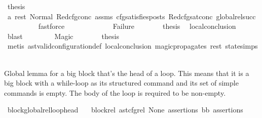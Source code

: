 \begin{isabellebody}
\ {\isacharquery}{\kern0pt}thesis\ \isamarkupfalse%
\ a{}\ rest{\isacharunderscore}{\kern0pt}{}\ Normal\ Red{\isacharunderscore}{\kern0pt}cfg{\isacharunderscore}{\kern0pt}conc\ assms{\isacharparenleft}{\kern0pt}{}{\isacharparenright}{\kern0pt}\ cfg{\isacharunderscore}{\kern0pt}satisfies{\isacharunderscore}{\kern0pt}posts\ Red{\isacharunderscore}{\kern0pt}cfg{\isacharunderscore}{\kern0pt}sat{\isacharunderscore}{\kern0pt}conc\ global{\isacharunderscore}{\kern0pt}rel{\isacharunderscore}{\kern0pt}succ\ \isanewline
\ \ \ \ \ \ \ \ \isamarkupfalse%
\ fastforce\isanewline
\ \ \ \ \isamarkupfalse%
\isanewline
\ \ \isamarkupfalse%
\isanewline
\ \ \ \ \isamarkupfalse%
\ Failure\isanewline
\ \ \ \ \isamarkupfalse%
\ \isamarkupfalse%
\ {\isacharquery}{\kern0pt}thesis\ \isamarkupfalse%
\ local{\isacharunderscore}{\kern0pt}conclusion\ \isamarkupfalse%
\ blast\isanewline
\ \ \isamarkupfalse%
\isanewline
\ \ \ \ \isamarkupfalse%
\ Magic\isanewline
\ \ \ \ \isamarkupfalse%
\ \isamarkupfalse%
\ {\isacharquery}{\kern0pt}thesis\ \isamarkupfalse%
\ {\isacharparenleft}{\kern0pt}metis\ ast{\isacharunderscore}{\kern0pt}valid{\isacharunderscore}{\kern0pt}configuration{\isacharunderscore}{\kern0pt}def\ local{\isacharunderscore}{\kern0pt}conclusion\ magic{\isacharunderscore}{\kern0pt}propagates\ rest\ state{\isachardot}{\kern0pt}simps{\isacharparenleft}{\kern0pt}{}{\isacharparenright}{\kern0pt}{\isacharparenright}{\kern0pt}\isanewline
\ \ \isamarkupfalse%
\isanewline
{}\isamarkupfalse%
%
\endisatagproof
{\isafoldproof}%
%
\isadelimproof
%
\endisadelimproof
%
\begin{isamarkuptext}%
Global lemma for a big block that's the head of a loop. 
      This means that it is a big block with a while-loop as its structured command and its set of simple commands is empty. 
      The body of the loop is required to be non-empty.%
\end{isamarkuptext}\isamarkuptrue%
\isamarkupfalse%
\ block{\isacharunderscore}{\kern0pt}global{\isacharunderscore}{\kern0pt}rel{\isacharunderscore}{\kern0pt}loop{\isacharunderscore}{\kern0pt}head{\isacharcolon}{\kern0pt}\isanewline
\ \ \ block{\isacharunderscore}{\kern0pt}rel{\isacharcolon}{\kern0pt}\ {\isachardoublequoteopen}ast{\isacharunderscore}{\kern0pt}cfg{\isacharunderscore}{\kern0pt}rel\ None\ assertions\ bb\ assertions{\isachardoublequoteclose}\isanewline

\end{isabellebody}
